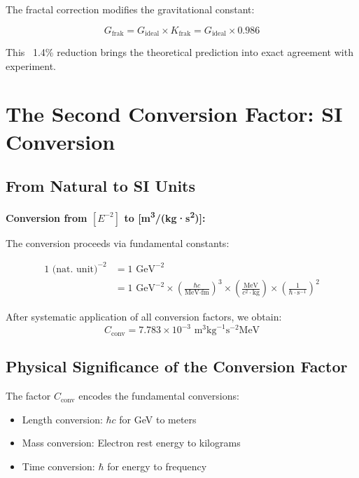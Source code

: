 \documentclass[12pt,a4paper]{article}
\begin{document}
	The fractal correction modifies the gravitational constant:
	
	\begin{equation}
		G_{\text{frak}} = G_{\text{ideal}} \times K_{\text{frak}} = G_{\text{ideal}} \times 0.986
	\end{equation}
	
	This ~1.4\% reduction brings the theoretical prediction into exact agreement with experiment.
	
	\section{The Second Conversion Factor: SI Conversion}
	
	\subsection{From Natural to SI Units}
	
	\begin{dimensional}
		\textbf{Conversion from $[E^{-2}]$ to [m\textsuperscript{3}/(kg·s\textsuperscript{2})]:}
		
		The conversion proceeds via fundamental constants:
		
		\begin{align}
			1 \text{ (nat. unit)}^{-2} &= 1 \text{ GeV}^{-2} \\
			&= 1 \text{ GeV}^{-2} \times \left(\frac{\hbar c}{\text{MeV·fm}}\right)^3 \times \left(\frac{\text{MeV}}{c^2 \cdot \text{kg}}\right) \times \left(\frac{1}{\hbar \cdot \text{s}^{-1}}\right)^2
		\end{align}
		
		After systematic application of all conversion factors, we obtain:
		\begin{equation}
			C_{\text{conv}} = 7.783 \times 10^{-3} \text{ m}^3\text{kg}^{-1}\text{s}^{-2}\text{MeV}
		\end{equation}
	\end{dimensional}
	
	\subsection{Physical Significance of the Conversion Factor}
	
	The factor $C_{\text{conv}}$ encodes the fundamental conversions:
	\begin{itemize}
		\item Length conversion: $\hbar c$ for GeV to meters
		\item Mass conversion: Electron rest energy to kilograms
		\item Time conversion: $\hbar$ for energy to frequency
	\end{itemize}
	
\end{document}
